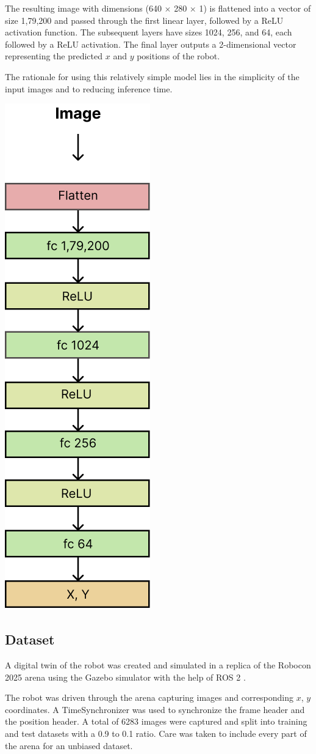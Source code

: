 \documentclass[a4paper]{article}
\begin{document}
\begin{multicols}{2}
\par \noindent
The resulting image with dimensions (640 $\times$ 280 $\times$ 1) is flattened into a vector 
of size 1,79,200 and passed through the first linear layer, followed by a ReLU activation function.
The subsequent layers have sizes 1024, 256, and 64, each followed by a ReLU activation. 
The final layer outputs a 2-dimensional vector representing the predicted $x$ and $y$ positions of the robot.

\par \noindent
The rationale for using this relatively simple model lies in the simplicity of the input images 
and to reducing inference time.

{ \centering
 \includegraphics[width=0.2\columnwidth]{../results/model.png}\\
 \label{pinki}
}

\subsection{Dataset} 

\par \noindent
A digital twin of the robot was created and simulated in a replica of the Robocon 2025 arena 
using the Gazebo \cite{gazebo} simulator with the help of ROS 2 \cite{macenski2022ros2}. 

\par \noindent
The robot was driven through the arena capturing images and corresponding $x$, $y$ coordinates. A 
TimeSynchronizer was used to synchronize the frame header and the position header. A total of
6283 images were captured and split into training  and test datasets with a 0.9 to 0.1 ratio.
Care was taken to include every part of the arena for an unbiased dataset. 


\end{multicols}
\end{document}
